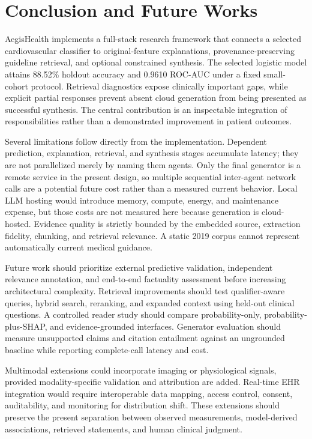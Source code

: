 \documentclass[journal]{IEEEtran}
\newcommand{\system}{AegisHealth}
\begin{document}
\section{Conclusion and Future Works}
\system{} implements a full-stack research framework that connects a selected cardiovascular classifier to original-feature explanations, provenance-preserving guideline retrieval, and optional constrained synthesis. The selected logistic model attains 88.52\% holdout accuracy and 0.9610 ROC-AUC under a fixed small-cohort protocol. Retrieval diagnostics expose clinically important gaps, while explicit partial responses prevent absent cloud generation from being presented as successful synthesis. The central contribution is an inspectable integration of responsibilities rather than a demonstrated improvement in patient outcomes.

Several limitations follow directly from the implementation. Dependent prediction, explanation, retrieval, and synthesis stages accumulate latency; they are not parallelized merely by naming them agents. Only the final generator is a remote service in the present design, so multiple sequential inter-agent network calls are a potential future cost rather than a measured current behavior. Local LLM hosting would introduce memory, compute, energy, and maintenance expense, but those costs are not measured here because generation is cloud-hosted. Evidence quality is strictly bounded by the embedded source, extraction fidelity, chunking, and retrieval relevance. A static 2019 corpus cannot represent automatically current medical guidance.

Future work should prioritize external predictive validation, independent relevance annotation, and end-to-end factuality assessment before increasing architectural complexity. Retrieval improvements should test qualifier-aware queries, hybrid search, reranking, and expanded context using held-out clinical questions. A controlled reader study should compare probability-only, probability-plus-SHAP, and evidence-grounded interfaces. Generator evaluation should measure unsupported claims and citation entailment against an ungrounded baseline while reporting complete-call latency and cost.

Multimodal extensions could incorporate imaging or physiological signals, provided modality-specific validation and attribution are added. Real-time EHR integration would require interoperable data mapping, access control, consent, auditability, and monitoring for distribution shift. These extensions should preserve the present separation between observed measurements, model-derived associations, retrieved statements, and human clinical judgment.



\end{document}
